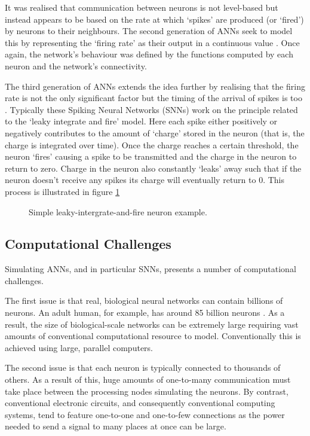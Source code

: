 			It was realised that communication between neurons is not level-based but
			instead appears to be based on the rate at which `spikes' are produced (or
			`fired') by neurons to their neighbours. The second generation of ANNs
			seek to model this by representing the `firing rate' as their output in a
			continuous value \cite{maass97}. Once again, the network's behaviour was
			defined by the functions computed by each neuron and the network's
			connectivity.
			
			The third generation of ANNs extends the idea further by realising that
			the firing rate is not the only significant factor but the timing of the
			arrival of spikes is too \cite{maass01}. Typically these Spiking Neural
			Networks (SNNs) work on the principle related to the `leaky integrate and
			fire' model. Here each spike either positively or negatively contributes
			to the amount of `charge' stored in the neuron (that is, the charge is
			integrated over time). Once the charge reaches a certain threshold, the
			neuron `fires' causing a spike to be transmitted and the charge in the
			neuron to return to zero. Charge in the neuron also constantly `leaks'
			away such that if the neuron doesn't receive any spikes its charge will
			eventually return to 0. This process is illustrated in figure
			\ref{fig:snn-example}
			
			\begin{figure}
				\center
				
				\caption{Simple leaky-intergrate-and-fire neuron example.}
				\label{fig:snn-example}
			\end{figure}
		
		\subsection{Computational Challenges}
			
			Simulating ANNs, and in particular SNNs, presents a number of
			computational challenges.
			
			The first issue is that real, biological neural networks can contain
			billions of neurons. An adult human, for example, has around 85 billion
			neurons \cite{herculano09}. As a result, the size of biological-scale
			networks can be extremely large requiring vast amounts of conventional
			computational resource to model. Conventionally this is achieved using
			large, parallel computers.
			
			The second issue is that each neuron is typically connected to thousands
			of others. As a result of this, huge amounts of one-to-many communication
			must take place between the processing nodes simulating the neurons.  By
			contrast, conventional electronic circuits, and consequently conventional
			computing systems, tend to feature one-to-one and one-to-few connections
			as the power needed to send a signal to many places at once can be large.
			

